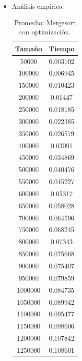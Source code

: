 \documentclass[a4paper,12pt,twoside]{article} %
\begin{document}
\begin{itemize}
	
	\item Análisis empírico.
	
\begin{table}[h]
	\begin{center}
		\begin{tabular}{|c|c|}
		\hline
		Tamaño & Tiempo \\
		\hline
		50000 & 0.003102 \\
		100000 & 0.006945 \\
		150000 & 0.010423 \\
		200000 & 0.01447 \\
		250000 & 0.018185 \\
		300000 & 0.022385 \\
		350000 & 0.026579 \\
		400000 & 0.03091 \\
		450000 & 0.034869 \\
		500000 & 0.040476 \\
		550000 & 0.045227 \\
		600000 & 0.05317 \\
		650000 & 0.058028 \\
		700000 & 0.064596 \\
		750000 & 0.068245 \\
		800000 & 0.07343 \\
		850000 & 0.075668 \\
		900000 & 0.075407 \\
		950000 & 0.079859 \\
		1000000 & 0.084735 \\
		1050000 & 0.089942 \\
		1100000 & 0.095477 \\
		1150000 & 0.098606 \\
		1200000 & 0.107842 \\
		1250000 & 0.108601 \\
		\hline
		\end{tabular}
	\end{center}
	\caption{Promedio: Mergesort con optimización.}
\end{table}
\newpage

\begin{figure}[h]
  \begin{center}
  

\end{center}
\end{figure}
\end{itemize}
\end{document}
